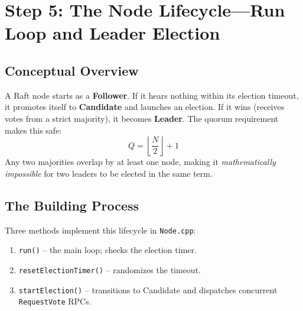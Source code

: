 \documentclass[11pt, a4paper]{article}
\begin{document}
\newpage

\section{Step 5: The Node Lifecycle---Run Loop and Leader Election}

\subsection{Conceptual Overview}
A Raft node starts as a \textbf{Follower}. If it hears nothing within its
election timeout, it promotes itself to \textbf{Candidate} and launches an
election. If it wins (receives votes from a strict majority), it becomes
\textbf{Leader}. The quorum requirement makes this safe:
\begin{equation}
    Q = \left\lfloor \frac{N}{2} \right\rfloor + 1
\end{equation}
Any two majorities overlap by at least one node, making it
\textit{mathematically impossible} for two leaders to be elected in the
same term.

\subsection{The Building Process}
Three methods implement this lifecycle in \texttt{Node.cpp}:
\begin{enumerate}[leftmargin=*]
    \item \texttt{run()} -- the main loop; checks the election timer.
    \item \texttt{resetElectionTimer()} -- randomizes the timeout.
    \item \texttt{startElection()} -- transitions to Candidate and
          dispatches concurrent \texttt{RequestVote} RPCs.
\end{enumerate}
\end{document}

